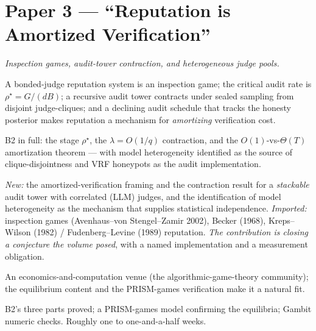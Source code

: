 \documentclass[11pt,a4paper]{article}
\begin{document}
\section{Paper 3 --- ``Reputation is Amortized Verification''}
\emph{Inspection games, audit-tower contraction, and heterogeneous judge pools.}
\begin{description}[leftmargin=0em,style=unboxed]
\item[Thesis.] A bonded-judge reputation system is an inspection game; the critical audit rate is $\rho^\star=G/(dB)$; a recursive audit tower contracts under sealed sampling from disjoint judge-cliques; and a declining audit schedule that tracks the honesty posterior makes reputation a mechanism for \emph{amortizing} verification cost.
\item[Results.] B2 in full: the stage $\rho^\star$, the $\lambda=O(1/q)$ contraction, and the $O(1)$-vs-$\Theta(T)$ amortization theorem --- with model heterogeneity identified as the source of clique-disjointness and VRF honeypots as the audit implementation.
\item[Novelty, honestly.] \emph{New:} the amortized-verification framing and the contraction result for a \emph{stackable} audit tower with correlated (LLM) judges, and the identification of model heterogeneity as the mechanism that supplies statistical independence. \emph{Imported:} inspection games (Avenhaus--von Stengel--Zamir 2002), Becker (1968), Kreps--Wilson (1982) / Fudenberg--Levine (1989) reputation. \emph{The contribution is closing a conjecture the volume posed}, with a named implementation and a measurement obligation.
\item[Venue.] An economics-and-computation venue (the algorithmic-game-theory community); the equilibrium content and the PRISM-games verification make it a natural fit.
\item[Gate.] B2's three parts proved; a PRISM-games model confirming the equilibria; Gambit numeric checks. Roughly one to one-and-a-half weeks.
\end{description}
\end{document}
